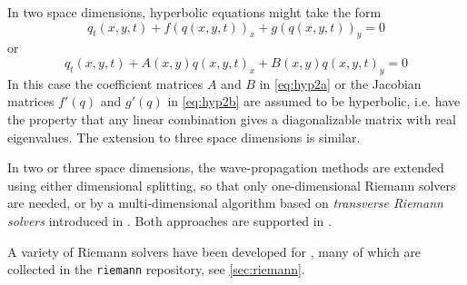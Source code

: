 In two space dimensions, hyperbolic equations might take the form
\begin{equation}\label{eq:hyp2a}
q_t(x,y,t) + f(q(x,y,t))_x + g(q(x,y,t))_y = 0
\end{equation}
or
\begin{equation}\label{eq:hyp2b}
q_t(x,y,t) + A(x,y)q(x,y,t)_x + B(x,y)q(x,y,t)_y = 0
\end{equation} 
In this case the
coefficient matrices $A$ and $B$ in \cref{eq:hyp2a} or the Jacobian matrices
$f'(q)$ and $g'(q)$ in \cref{eq:hyp2b} are assumed to be hyperbolic, i.e. have
the property that any
linear combination gives a diagonalizable matrix with real eigenvalues.
The extension to three space dimensions is similar.

In two or three space dimensions, the wave-propagation methods
are extended using either dimensional splitting, so that only
one-dimensional Riemann solvers are needed, or by a multi-dimensional
algorithm based on {\em transverse Riemann solvers} introduced in 
\cite{rjl:wpalg}.  Both approaches are supported in \clawpack.

A variety of Riemann solvers have been developed for \clawpack, many of which
are collected in the \texttt{riemann} repository, see \cref{sec:riemann}.

